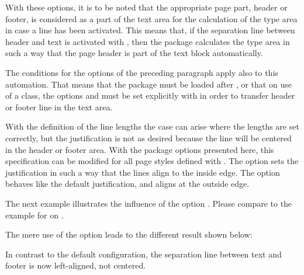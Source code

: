 With these options, it is to be noted that the appropriate page part,
header or footer, is considered as a part of the text area for the
calculation of the type area in case a line has been activated.  This
means that, if the separation line between header and text is
activated with , then the package
 calculates the type area in such a way that the
page header is part of the text block automatically.

The conditions for the options of the preceding paragraph
apply also to this automation. That means that the package 
must be loaded after , or that on use of a {\KOMAScript}
class, the options  and  must be set
explicitly with  in order to transfer header or footer
line in the text area.%
%
\EndIndexGroup


\begin{Declaration}
%
%
\end{Declaration}%
%
With the definition of the line lengths the case can arise where the
lengths are set correctly, but the justification is not as desired
because the line will be centered in the header or footer area.  With
the package options presented here, this specification can be modified
for all page styles defined with .  The option
 sets the justification in such a way that the lines
align to the inside edge.  The option  behaves like the
default justification, and  aligns at the outside edge.

\begin{Example}
  The next example illustrates the influence of the
  option . Please compare to the example for
   on .
\begin{lstcode}
  \usepackage[ilines]{scrpage2}
  \setfootbotline{2pt}  
  \setfootsepline[text]{.4pt}
\end{lstcode}
  The mere use of the option  leads to the different
  result shown below:
\begin{XmpBotPage}
        \thinlines{}
        \thicklines{}
\end{XmpBotPage}
  In contrast to the default configuration, the separation line between
  text and footer is now left-aligned, not centered.%
\end{Example}%
\EndIndexGroup


